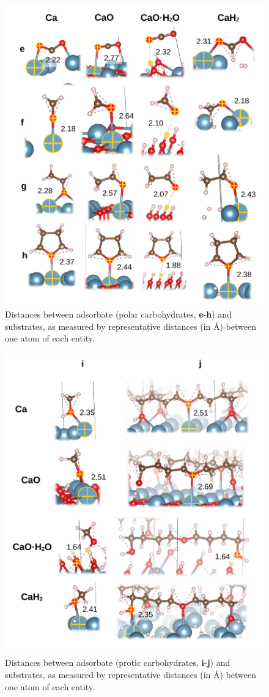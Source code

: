 \documentclass[12pt,a4paper]{article}
\begin{document}
\begin{figure}[!h]
\centering
\includegraphics[width=.7\linewidth]{Figure7}
\caption{Distances between adsorbate (polar carbohydrates, \textbf{e}-\textbf{h}) and substrates, as measured by representative distances (in \si{\angstrom}) between one atom of each entity.}
\label{fig:distseh}
\end{figure}

\begin{figure}[!h]
\centering
\includegraphics[width=.7\linewidth]{Figure8}
\caption{Distances between adsorbate (protic carbohydrates, \textbf{i}-\textbf{j}) and substrates, as measured by representative distances (in \si{\angstrom}) between one atom of each entity.}
\label{fig:distsij}
\end{figure}
\end{document}
